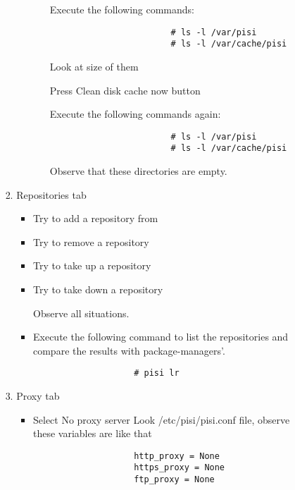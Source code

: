 \documentclass[a4paper,10pt]{article}
\begin{document}
\begin{enumerate}
\begin{enumerate}
\begin{enumerate}
\begin{enumerate}
\begin{itemize}
\begin{itemize}
                        Execute the following commands: 
                        \begin{verbatim}
                        # ls -l /var/pisi
                        # ls -l /var/cache/pisi
                        \end{verbatim}

                        Look at size of them 

                        Press Clean disk cache now button

                        Execute the following commands again:

                        \begin{verbatim}
                        # ls -l /var/pisi
                        # ls -l /var/cache/pisi
                        \end{verbatim}

                        Observe that these directories are empty.
                    \end{itemize}
                \end{itemize} 
                \item Repositories tab
                \begin{itemize}
                    \item Try to add a repository from 
                    \item Try to remove a repository
                    \item Try to take up a repository 
                    \item Try to take down a repository 

                    Observe all situations.
                    \item Execute the following command to list the repositories and compare the results with package-managers'.
                    \begin{verbatim}
                    # pisi lr
                    \end{verbatim}
                \end{itemize}
                \item Proxy tab
                \begin{itemize}
                    \item  Select No proxy server 
                    Look /etc/pisi/pisi.conf file, observe these variables are like that
                    \begin{verbatim}
                    http_proxy = None
                    https_proxy = None
                    ftp_proxy = None
                    \end{verbatim}
    

\end{itemize}
\end{enumerate}
\end{enumerate}
\end{enumerate}
\end{enumerate}
\end{document}
